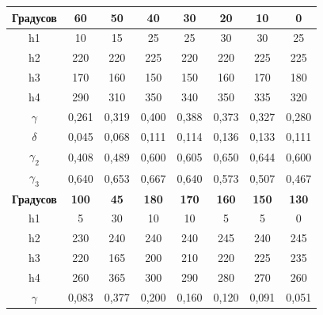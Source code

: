 \documentclass[a4paper, 12pt]{article}
\begin{document}
\begin{table}[H]
	\centering
	\begin{tabular}{|c|c|c|c|c|c|c|c|}
	\hline
	\textbf{Градусов} & \textbf{60}  & \textbf{50} & \textbf{40}  & \textbf{30}  & \textbf{20}  & \textbf{10}  & \textbf{0}   \\ \hline
	h1                & 10           & 15          & 25           & 25           & 30           & 30           & 25           \\ \hline
	h2                & 220          & 220         & 225          & 220          & 220          & 225          & 225          \\ \hline
	h3                & 170          & 160         & 150          & 150          & 160          & 170          & 180          \\ \hline
	h4                & 290          & 310         & 350          & 340          & 350          & 335          & 320          \\ \hline
	$\gamma$          & 0,261        & 0,319       & 0,400        & 0,388        & 0,373        & 0,327        & 0,280        \\ \hline
	$\delta$          & 0,045        & 0,068       & 0,111        & 0,114        & 0,136        & 0,133        & 0,111        \\ \hline
	$\gamma_2$        & 0,408        & 0,489       & 0,600        & 0,605        & 0,650        & 0,644        & 0,600        \\ \hline
	$\gamma_3$        & 0,640        & 0,653       & 0,667        & 0,640        & 0,573        & 0,507        & 0,467        \\ \hline
	\textbf{Градусов} & \textbf{100} & \textbf{45} & \textbf{180} & \textbf{170} & \textbf{160} & \textbf{150} & \textbf{130} \\ \hline
	h1                & 5            & 30          & 10           & 10           & 5            & 5            & 0            \\ \hline
	h2                & 230          & 240         & 240          & 240          & 245          & 240          & 245          \\ \hline
	h3                & 220          & 165         & 200          & 210          & 220          & 225          & 235          \\ \hline
	h4                & 260          & 365         & 300          & 290          & 280          & 270          & 260          \\ \hline
	$\gamma$          & 0,083        & 0,377       & 0,200        & 0,160        & 0,120        & 0,091        & 0,051        \\ \hline

\end{tabular}
\end{table}
\end{document}
